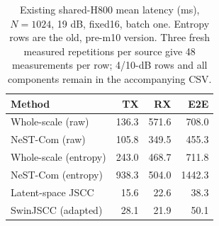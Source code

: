 \begin{table}[t]
\centering
\caption{Existing shared-H800 mean latency (ms), $N=1024$, 19 dB, fixed16, batch one. Entropy rows are the old, pre-m10 version. Three fresh measured repetitions per source give 48 measurements per row; 4/10-dB rows and all components remain in the accompanying CSV.}
\label{tab:timing}
\footnotesize\setlength{\tabcolsep}{4pt}
\begin{tabular}{lrrr}
\toprule
Method & TX & RX & E2E \\
\midrule
Whole-scale (raw) & 136.3 & 571.6 & 708.0 \\
NeST-Com (raw) & 105.8 & 349.5 & 455.3 \\
Whole-scale (entropy) & 243.0 & 468.7 & 711.8 \\
NeST-Com (entropy) & 938.3 & 504.0 & 1442.3 \\
Latent-space JSCC & 15.6 & 22.6 & 38.3 \\
SwinJSCC (adapted) & 28.1 & 21.9 & 50.1 \\
\bottomrule
\end{tabular}
\end{table}
